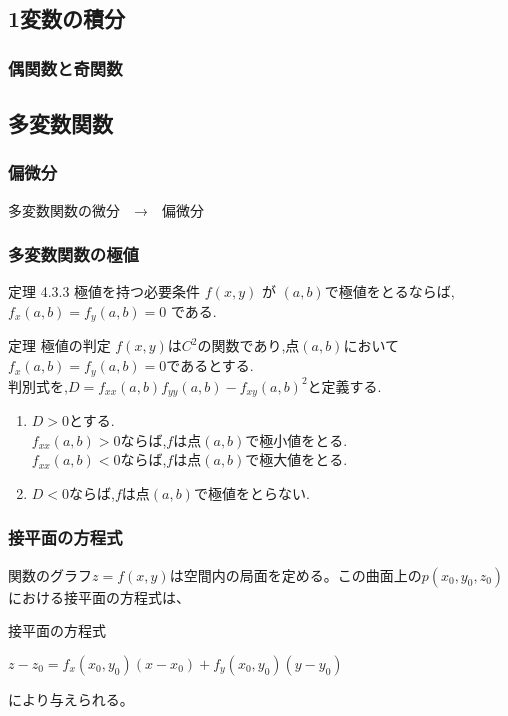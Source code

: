 \documentclass[a4paper]{jsarticle}
\begin{document}
\subsection{1変数の積分}
\subsubsection{偶関数と奇関数}

\subsection{多変数関数}
\subsubsection{偏微分}
多変数関数の微分　→　偏微分
\subsubsection{多変数関数の極値}
\begin{itembox}[l]{定理 4.3.3 極値を持つ必要条件}
    $f\left(x,y\right)$ が $\left(a,b\right)$で極値をとるならば,
    $f_x\left(a,b\right)=f_y\left(a,b\right)=0$ である.
\end{itembox}
\begin{itembox}[l]{定理 極値の判定}
    $f\left(x,y\right)$は$C^2$の関数であり,点$\left(a,b\right)$において
    $f_x\left(a,b\right)=f_y\left(a, b\right)=0$であるとする.\\
    判別式を,$D=f_{xx}\left(a,b\right)f_{yy}\left(a,b\right)-{f_{xy}(a,b)}^2$と定義する.
    \begin{enumerate}[(1)]
        \item $D>0$とする.\\
              $f_{xx}\left(a,b\right)>0$ならば,$f$は点$\left(a,b\right)$で極小値をとる.\\
              $f_{xx}\left(a,b\right)<0$ならば,$f$は点$\left(a,b\right)$で極大値をとる.
        \item $D<0$ならば,$f$は点$\left(a,b\right)$で極値をとらない.
    \end{enumerate}
\end{itembox}
\subsubsection{接平面の方程式}
関数のグラフ$z=f\left(x,y\right)$は空間内の局面を定める。この曲面上の$p(x_0,y_0,z_0)$における接平面の方程式は、
\begin{itembox}[l]{接平面の方程式}
    \begin{center}
        $z-z_0=f_x\left(x_0,y_0\right)\left(x-x_0\right)+f_y\left(x_0,y_0\right)\left(y-y_0\right)$
    \end{center}
\end{itembox}
により与えられる。
\end{document}
